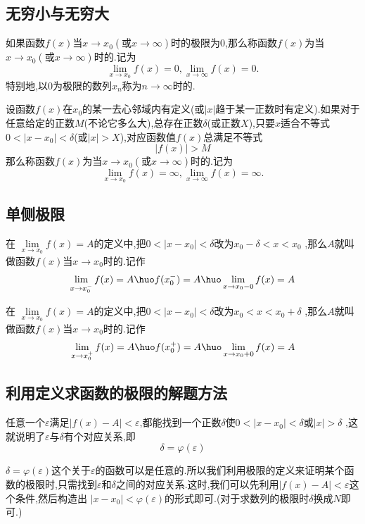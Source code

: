 \subsection{无穷小与无穷大}
\tdefination[无穷小]
如果函数$f(x)$当$x\to x_0\left(\mbox{或}x \to \infty  \right) $时的极限为$0$,那么称函数$f(x)$为当$x\to x_0\left(\mbox{或}x \to \infty  \right) $时的.记为
\begin{equation}
	\lim\limits_{x \to x_0}f(x)=0,\lim\limits_{x\to \infty}f(x)=0.
\end{equation}
特别地,以$0$为极限的数列${x_n}$称为$n\to \infty$时的.
\jg

设函数$f(x)$在$x_0$的某一去心邻域内有定义(或$|x|$趋于某一正数时有定义).如果对于任意给定的正数$M$(不论它多么大),总存在正数$\delta$(或正数$X$),只要$x$适合不等式$0<|x-x_0|<\delta$(或$|x|>X$),对应函数值$f(x)$总满足不等式
\begin{equation*}
	|f(x)|>M
\end{equation*}
那么称函数$f(x)$为当$x\to x_0\left(\mbox{或}x \to \infty  \right) $时的.记为
\begin{equation}
	\lim\limits_{x \to x_0}f(x)=\infty,\lim\limits_{x\to \infty}f(x)=\infty.
\end{equation}

\subsection{单侧极限}
\tdefination[左极限]
在 $\lim\limits_{x \to x_0}f(x)=A$的定义中,把$0<|x-x_0 |<\delta$改为$x_0-\delta <x<x_0$ ,那么$A$就叫做函数$f(x)$当$x \to x_0$时的.记作
\begin{equation}
	\lim\limits_{x \to x_0^-}f(x)=A \huo f(x_0^-)=A \huo \lim\limits_{x \to x_0 - 0}f(x)=A
\end{equation}

在 $\lim\limits_{x \to x_0}f(x)=A$的定义中,把$0<|x-x_0 |<\delta$改为$x_0 <x<x_0+\delta$ ,那么$A$就叫做函数$f(x)$当$x \to x_0$时的.记作
\begin{equation}
	\lim\limits_{x \to x_0^+}f(x)=A \huo f(x_0^+)=A \huo \lim\limits_{x \to x_0 + 0}f(x)=A
\end{equation}

\subsection{利用定义求函数的极限的解题方法}
任意一个$\varepsilon$满足$|f(x)-A|<\varepsilon$,都能找到一个正数$\delta$使$0 < |x - x_0| < \delta$或$|x| > \delta$ ,这就说明了$\varepsilon$与$\delta $有个对应关系,即
\begin{equation}
	\delta=\varphi(\varepsilon)
\end{equation}
\par $\delta=\varphi(\varepsilon)$这个关于$\varepsilon$的函数可以是任意的.所以我们利用极限的定义来证明某个函数的极限时,只需找到$\varepsilon$和$\delta$之间的对应关系.这时,我们可以先利用$|f(x)-A|<\varepsilon$这个条件,然后构造出 $|x - x_0| < \varphi(\varepsilon)$的形式即可.(对于求数列的极限时$\delta$换成$N$即可.)

